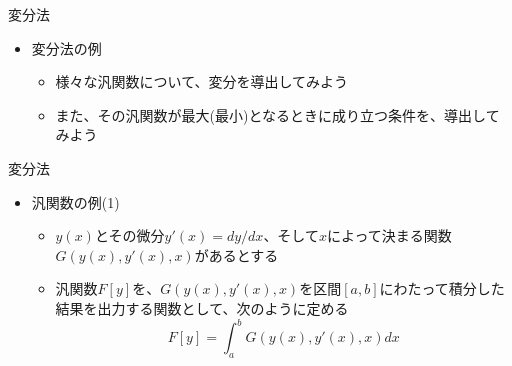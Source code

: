 \documentclass[dvipdfmx,notheorems,t]{beamer}
\begin{document}
\begin{frame}{変分法}

\begin{itemize}
	\item 変分法の例
	\begin{itemize}
		\item 様々な汎関数について、変分を導出してみよう
		\item また、その汎関数が最大(最小)となるときに成り立つ条件を、導出してみよう
	\end{itemize}
\end{itemize}

\end{frame}

\begin{frame}{変分法}
	
\begin{itemize}
	\item 汎関数の例(1)
	\begin{itemize}
		\item $y(x)$とその微分$y'(x) = dy/dx$、そして$x$によって決まる関数\color{red}$G(y(x), y'(x), x)$\normalcolor があるとする
		\newline
		\item 汎関数$F[y]$を、$G(y(x), y'(x), x)$を区間$[a, b]$にわたって積分した結果を出力する関数として、次のように定める
		\begin{equation}
			F[y] = \int_a^b G(y(x), y'(x), x) dx
		\end{equation}
		

\end{itemize}
\end{itemize}
\end{frame}
\end{document}
